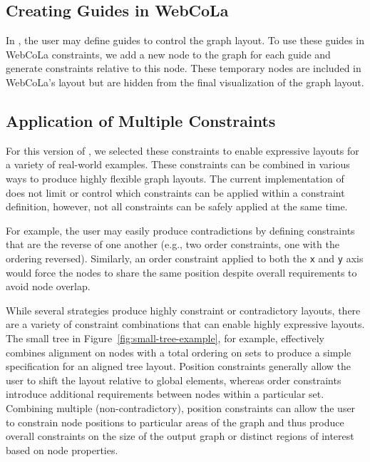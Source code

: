 \subsection{Creating Guides in WebCoLa}

In \projectname, the user may define guides to control the graph layout.
To use these guides in WebCoLa constraints, we add a new node to the graph
for each guide and generate constraints relative to this node. These 
temporary nodes are included in WebCoLa's layout but are hidden from the
final visualization of the graph layout.

\subsection{Application of Multiple Constraints}
For this version of \projectname, we selected these constraints to enable
expressive layouts for a variety of real-world examples. These constraints
can be combined in various ways to produce highly flexible graph layouts.
The current implementation of \projectname does not limit or control which
constraints can be applied within a constraint definition, however, not
all constraints can be safely applied at the same time.

For example, the user may easily produce contradictions by defining constraints
that are the reverse of one another (e.g., two order constraints, one with the
ordering reversed). Similarly, an order constraint applied to both the \texttt{x}
and \texttt{y} axis would force the nodes to share the same position despite
overall requirements to avoid node overlap. 

While several strategies produce highly constraint or contradictory layouts, 
there are a variety of constraint combinations that can enable highly 
expressive layouts. The small tree in Figure~\ref{fig:small-tree-example}, for 
example, effectively combines alignment on nodes with a total ordering on sets 
to produce a simple specification for an aligned tree layout. Position constraints
generally allow the user to shift the layout relative to global elements,
whereas order constraints introduce additional requirements between nodes
within a particular set. Combining multiple (non-contradictory), position
constraints can allow the user to constrain node positions to particular
areas of the graph and thus produce overall constraints on the size of the
output graph or distinct regions of interest based on node properties.


